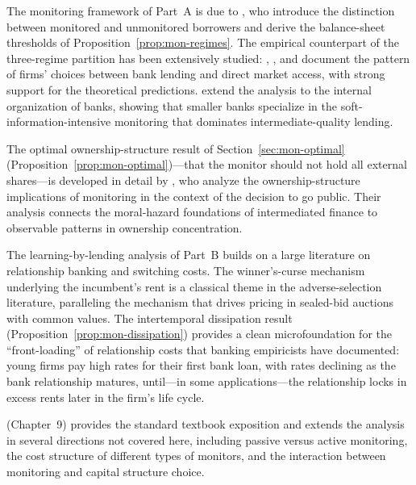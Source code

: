 \documentclass[11pt,a4paper,oneside]{book}
\theoremstyle{plain}
\theoremstyle{definition}
\theoremstyle{remark}
\numberwithin{equation}{chapter}
\begin{document}
The monitoring framework of Part~A is due to \citet{HolmstromTirole1997}, who introduce the distinction between monitored and unmonitored borrowers and derive the balance-sheet thresholds of Proposition~\ref{prop:mon-regimes}.
The empirical counterpart of the three-regime partition has been extensively studied: \citet{James1987}, \citet{LummerMcConnell1989}, and \citet{CantilloWright2000} document the pattern of firms' choices between bank lending and direct market access, with strong support for the theoretical predictions.
\citet{BergerMillerPetersenRajanStein2005} extend the analysis to the internal organization of banks, showing that smaller banks specialize in the soft-information-intensive monitoring that dominates intermediate-quality lending.

The optimal ownership-structure result of Section~\ref{sec:mon-optimal} (Proposition~\ref{prop:mon-optimal})---that the monitor should not hold all external shares---is developed in detail by \citet{PaganoRoell1998}, who analyze the ownership-structure implications of monitoring in the context of the decision to go public.
Their analysis connects the moral-hazard foundations of intermediated finance to observable patterns in ownership concentration.

The learning-by-lending analysis of Part~B builds on a large literature on relationship banking and switching costs.
The winner's-curse mechanism underlying the incumbent's rent is a classical theme in the adverse-selection literature, paralleling the mechanism that drives pricing in sealed-bid auctions with common values.
The intertemporal dissipation result (Proposition~\ref{prop:mon-dissipation}) provides a clean microfoundation for the ``front-loading'' of relationship costs that banking empiricists have documented: young firms pay high rates for their first bank loan, with rates declining as the bank relationship matures, until---in some applications---the relationship locks in excess rents later in the firm's life cycle.

\citet{Tirole2006} (Chapter~9) provides the standard textbook exposition and extends the analysis in several directions not covered here, including passive versus active monitoring, the cost structure of different types of monitors, and the interaction between monitoring and capital structure choice.
\end{document}
